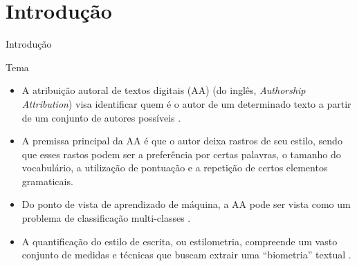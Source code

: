 \section{Introdução}

\begin{frame}{Introdução}
	\begin{alertblock}{Tema}
		\begin{itemize}\itemsep9pt
		\item A atribuição autoral de textos digitais (AA) (do inglês, {\it Authorship Attribution})  visa identificar quem é o autor de um determinado texto a partir de um conjunto de autores possíveis \cite{Potthast2017}.
		
		\item A premissa principal da AA é que o autor deixa rastros de seu estilo, sendo que esses rastos podem ser a preferência por certas palavras, o tamanho do vocabulário, a utilização de pontuação e a repetição de certos elementos gramaticais.
		
		\item Do ponto de vista de aprendizado de máquina, a AA pode ser vista como um problema de classificação multi-classes \cite{Stamatatos2009}.
		
		\item A quantificação do estilo de escrita, ou estilometria, compreende um vasto conjunto de medidas e técnicas que buscam extrair uma ``biometria'' textual \cite{Neal2017}.
		\end{itemize}
	\end{alertblock}

\end{frame}

